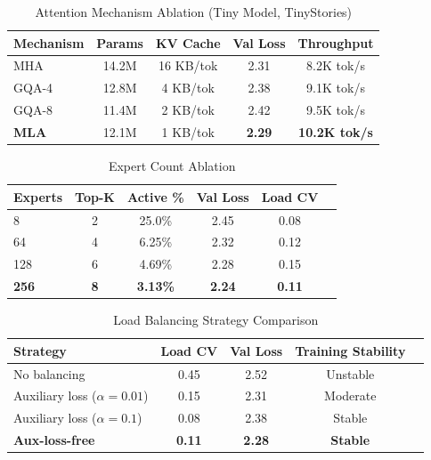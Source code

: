 
\begin{table}[htbp]
\centering
\caption{Attention Mechanism Ablation (Tiny Model, TinyStories)}
\label{tab:attention-ablation}
\begin{tabular}{@{}lcccc@{}}
\toprule
\textbf{Mechanism} & \textbf{Params} & \textbf{KV Cache} & \textbf{Val Loss} & \textbf{Throughput} \\
\midrule
MHA & 14.2M & 16 KB/tok & 2.31 & 8.2K tok/s \\
GQA-4 & 12.8M & 4 KB/tok & 2.38 & 9.1K tok/s \\
GQA-8 & 11.4M & 2 KB/tok & 2.42 & 9.5K tok/s \\
\textbf{MLA} & 12.1M & 1 KB/tok & \textbf{2.29} & \textbf{10.2K tok/s} \\
\bottomrule
\end{tabular}
\end{table}

\begin{table}[htbp]
\centering
\caption{Expert Count Ablation}
\label{tab:expert-ablation}
\begin{tabular}{@{}lccccc@{}}
\toprule
\textbf{Experts} & \textbf{Top-K} & \textbf{Active \%} & \textbf{Val Loss} & \textbf{Load CV} \\
\midrule
8 & 2 & 25.0\% & 2.45 & 0.08 \\
64 & 4 & 6.25\% & 2.32 & 0.12 \\
128 & 6 & 4.69\% & 2.28 & 0.15 \\
\textbf{256} & \textbf{8} & \textbf{3.13\%} & \textbf{2.24} & \textbf{0.11} \\
\bottomrule
\end{tabular}
\end{table}

\begin{table}[htbp]
\centering
\caption{Load Balancing Strategy Comparison}
\label{tab:balancing-ablation}
\begin{tabular}{@{}lcccc@{}}
\toprule
\textbf{Strategy} & \textbf{Load CV} & \textbf{Val Loss} & \textbf{Training Stability} \\
\midrule
No balancing & 0.45 & 2.52 & Unstable \\
Auxiliary loss ($\alpha=0.01$) & 0.15 & 2.31 & Moderate \\
Auxiliary loss ($\alpha=0.1$) & 0.08 & 2.38 & Stable \\
\textbf{Aux-loss-free} & \textbf{0.11} & \textbf{2.28} & \textbf{Stable} \\
\bottomrule
\end{tabular}
\end{table}

